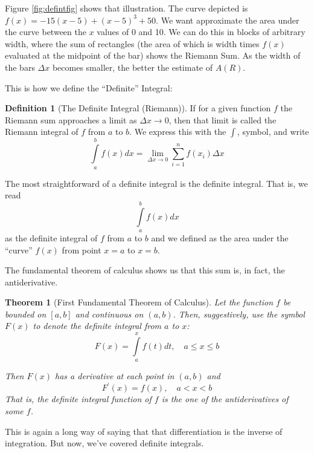 \documentclass[
]{book}
\newtheorem{theorem}{Theorem}[chapter]
\theoremstyle{definition}
\newtheorem{definition}{Definition}[chapter]
\theoremstyle{definition}
\theoremstyle{definition}
\theoremstyle{definition}
\theoremstyle{remark}
\begin{document}
Figure \ref{fig:defintfig} shows that illustration. The curve depicted is \(f(x) = -15(x - 5) + (x - 5)^3 + 50.\) We want approximate the area under the curve between the \(x\) values of 0 and 10. We can do this in blocks of arbitrary width, where the sum of rectangles (the area of which is width times \(f(x)\) evaluated at the midpoint of the bar) shows the Riemann Sum. As the width of the bars \(\Delta x\) becomes smaller, the better the estimate of \(A(R)\).

This is how we define the ``Definite'' Integral:

\begin{definition}[The Definite Integral (Riemann)]
\protect\hypertarget{def:unnamed-chunk-213}{}{\label{def:unnamed-chunk-213} {} }If for a given function \(f\) the Riemann sum approaches a limit as \(\Delta x \to 0\), then that limit is called the Riemann integral of \(f\) from \(a\) to \(b\). We express this with the \(\int\), symbol, and write \[\int\limits_a^b f(x) dx= \lim\limits_{\Delta x\to 0} \sum\limits_{i=1}^n f(x_i)\Delta x\]

The most straightforward of a definite integral is the definite integral. That is, we read
\[\int\limits_a^b f(x) dx\] as the definite integral of \(f\) from \(a\) to \(b\) and we defined as the area under the ``curve'' \(f(x)\) from point \(x=a\) to \(x=b\).
\end{definition}

The fundamental theorem of calculus shows us that this sum is, in fact, the antiderivative.

\begin{theorem}[First Fundamental Theorem of Calculus]
\protect\hypertarget{thm:unnamed-chunk-214}{}{\label{thm:unnamed-chunk-214} {} }Let the function \(f\) be bounded on \([a,b]\) and continuous on \((a,b)\). Then, suggestively, use the symbol \(F(x)\) to denote the definite integral from \(a\) to \(x\):
\[F(x)=\int\limits_a^x f(t)dt, \quad a\le x\le b\]

Then \(F(x)\) has a derivative at each point in \((a,b)\) and \[F^\prime(x)=f(x), \quad a<x<b\]
That is, the definite integral function of \(f\) \emph{is} the one of the antiderivatives of some \(f\).
\end{theorem}

This is again a long way of saying that that differentiation is the inverse of integration. But now, we've covered definite integrals.
\end{document}

